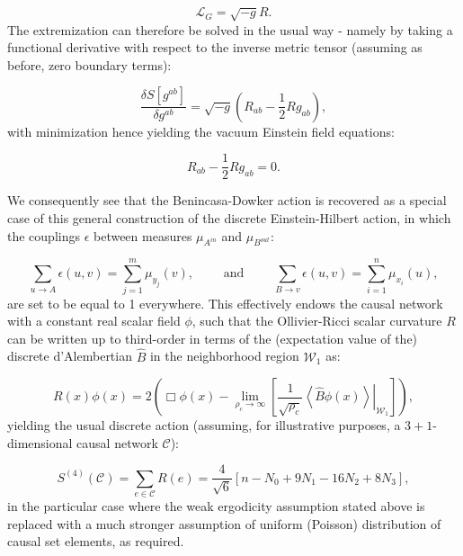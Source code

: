 \documentclass{article}
\begin{document}
\begin{equation}
\mathcal{L}_G = \sqrt{-g} R.
\end{equation}
The extremization can therefore be solved in the usual way - namely by taking a functional derivative with respect to the inverse metric tensor (assuming as before, zero boundary terms):

\begin{equation}
\frac{\delta S \left[ g^{a b} \right]}{\delta g^{a b}} = \sqrt{- g} \left( R_{a b} - \frac{1}{2} R g_{a b} \right),
\end{equation}
with minimization hence yielding the vacuum Einstein field equations:

\begin{equation}
R_{a b} - \frac{1}{2} R g_{a b} = 0.
\end{equation}

We consequently see that the Benincasa-Dowker action is recovered as a special case of this general construction of the discrete Einstein-Hilbert action, in which the couplings ${\epsilon}$ between measures ${\mu_{A^{in}}}$ and ${\mu_{B^{out}}}$:

\begin{equation}
\sum_{u \to A} \epsilon \left( u, v \right) = \sum_{j = 1}^{m} \mu_{y_j} \left( v \right), \qquad \text{ and } \qquad \sum_{B \to v} \epsilon \left( u, v \right) = \sum_{i = 1}^{n} \mu_{x_i} \left( u \right),
\end{equation}
are set to be equal to 1 everywhere. This effectively endows the causal network with a constant real scalar field ${\phi}$, such that the Ollivier-Ricci scalar curvature $R$ can be written up to third-order in terms of the (expectation value of the) discrete d'Alembertian ${\hat{B}}$ in the neighborhood region ${\mathcal{W}_1}$ as:

\begin{equation}
R \left( x \right) \phi \left( x \right) = 2 \left( \Box \phi \left( x \right) - \lim_{\rho_c \to \infty} \left[ \frac{1}{\sqrt{\rho_c}} \left. \left\langle \hat{B} \phi \left( x \right) \right\rangle \right\rvert_{\mathcal{W}_1} \right] \right),
\end{equation}
yielding the usual discrete action (assuming, for illustrative purposes, a ${3+1}$-dimensional  causal network ${\mathcal{C}}$):

\begin{equation}
S^{\left( 4 \right)} \left( \mathcal{C} \right) = \sum_{e \in \mathcal{C}} R \left( e \right) = \frac{4}{\sqrt{6}} \left[ n - N_0 + 9 N_1 - 16 N_2 + 8 N_3 \right],
\end{equation}
in the particular case where the weak ergodicity assumption stated above is replaced with a much stronger assumption of uniform (Poisson) distribution of causal set elements, as required.
\end{document}
